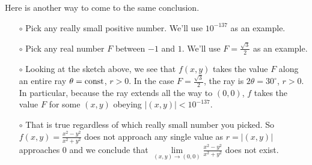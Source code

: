 \begin{eg}
Here is another way to come to the same conclusion.
\begin{itemize}
\item[$\circ$]
Pick any really small positive number. We'll use $10^{-137}$ as an example.  
\item[$\circ$]
Pick any real number $F$ between $-1$ and $1$. We'll use 
$F=\frac{\sqrt{3}}{2}$ as an example.
\item[$\circ$]
Looking at the sketch above, we see that $f(x,y)$ takes the value $F$
along an entire ray $\theta={\rm const}$, $r>0$. In the case $F=\frac{\sqrt{3}}{2}$,
the ray is $2\theta=30^{\circ}$, $r>0$. In particular, because the ray
extends all the way to $(0,0)$, $f$ takes the value $F$ for some $(x,y)$ 
obeying $|(x,y)|<10^{-137}$. 
\item[$\circ$]
That is true regardless of which really small number you picked. So $f(x,y)=\frac{x^2-y^2}{x^2+y^2}$ 
does not approach any single value as $r=|(x,y)|$ approaches $0$
and we conclude that 
$\lim\limits_{(x,y)\rightarrow (0,0)}\frac{x^2-y^2}{x^2+y^2}$
does not exist.
\end{itemize}

\end{eg}

